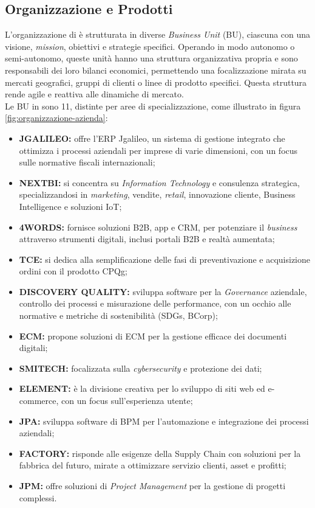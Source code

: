 \subsection{Organizzazione e Prodotti}
L'organizzazione di \azienda è strutturata in diverse \textit{Business Unit} (BU), ciascuna con una visione, \textit{mission}, obiettivi e strategie specifici. Operando in modo autonomo o semi-autonomo, queste unità hanno una struttura organizzativa propria e sono responsabili dei loro bilanci economici, permettendo una focalizzazione mirata su mercati geografici, gruppi di clienti o linee di prodotto specifici. Questa struttura rende \azienda agile e reattiva alle dinamiche di mercato. \\
Le BU in \azienda sono 11, distinte per aree di specializzazione, come illustrato in figura \ref{fig:organizzazione-azienda}:
\begin{itemize}
\item \textbf{JGALILEO:} offre l’\gls{ERP} Jgalileo, un sistema di gestione integrato che ottimizza i processi aziendali per imprese di varie dimensioni, con un focus sulle normative fiscali internazionali;
\item \textbf{NEXTBI:} si concentra su \textit{Information Technology} e consulenza strategica, specializzandosi in \textit{marketing}, vendite, \textit{retail}, innovazione cliente, Business Intelligence e soluzioni \gls{IoT};
\item \textbf{4WORDS:} fornisce soluzioni \gls{B2B}, app e \gls{CRM}, per potenziare il \textit{business} attraverso strumenti digitali, inclusi portali B2B e realtà aumentata;
\item \textbf{TCE:} si dedica alla semplificazione delle fasi di preventivazione e acquisizione ordini con il prodotto \gls{CPQg};
\item \textbf{DISCOVERY QUALITY:} sviluppa software per la \textit{Governance} aziendale, controllo dei processi e misurazione delle performance, con un occhio alle normative e metriche di sostenibilità (\gls{SDGs}, \gls{BCorp});
\item \textbf{ECM:} propone soluzioni di \gls{ECM} per la gestione efficace dei documenti digitali;
\item \textbf{SMITECH:} focalizzata sulla \textit{\gls{cybersecurity}} e protezione dei dati;
\item \textbf{ELEMENT:} è la divisione creativa per lo sviluppo di siti web ed e-commerce, con un focus sull'esperienza utente;
\item \textbf{JPA:} sviluppa software di \gls{BPM} per l'automazione e integrazione dei processi aziendali;
\item \textbf{FACTORY:} risponde alle esigenze della \gls{Supply Chain} con soluzioni per la fabbrica del futuro, mirate a ottimizzare servizio clienti, asset e profitti;
\item \textbf{JPM:} offre soluzioni di \textit{\gls{Project Management}} per la gestione di progetti complessi.
\end{itemize}

